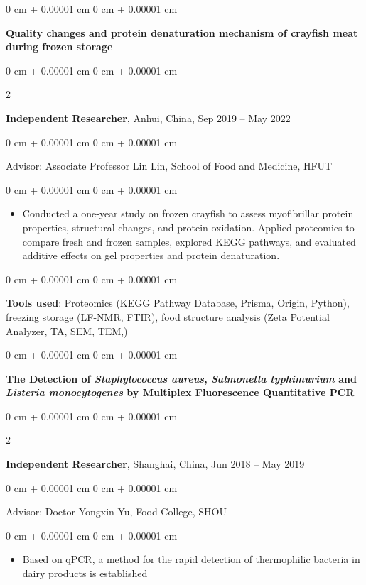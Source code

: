 \documentclass[10pt, letterpaper]{article}
\newenvironment{highlights}{
    \begin{itemize}[
        topsep=0.10 cm,
        parsep=0.10 cm,
        partopsep=0pt,
        itemsep=0pt,
        leftmargin=0 cm + 10pt
    ]
}{
    \end{itemize}
} %
\newenvironment{onecolentry}{
    \begin{adjustwidth}{
        0 cm + 0.00001 cm
    }{
        0 cm + 0.00001 cm
    }
}{
    \end{adjustwidth}
} %
\newenvironment{twocolentry}[2][]{
    \onecolentry
    \def\secondColumn{#2}
    \setcolumnwidth{\fill, 4.5 cm}
    \begin{paracol}{2}
}{
    \switchcolumn \raggedleft \secondColumn
    \end{paracol}
    \endonecolentry
} %
\newenvironment{header}{
    \setlength{\topsep}{0pt}\par\kern\topsep\centering\linespread{1}
}{
    \par\kern\topsep
} %
\begin{document}
\begin{header}
\vspace{0.2 cm}


                \begin{onecolentry}
        \textbf{\textbf{Quality changes and protein denaturation mechanism of crayfish meat during frozen storage }}
    \end{onecolentry}
        \begin{twocolentry}{
            Sep 2019 – May 2022
        }
            \textbf{Independent Researcher}, Anhui, China, \end{twocolentry}
\begin{onecolentry}
    Advisor: Associate Professor Lin Lin, School of Food and Medicine, HFUT
\end{onecolentry}
        \vspace{0.10 cm}
        \begin{onecolentry}
            \begin{highlights}
                \item Conducted a one-year study on frozen crayfish to assess myofibrillar protein properties, structural changes, and protein oxidation. Applied proteomics to compare fresh and frozen samples, explored KEGG pathways, and evaluated additive effects on gel properties and protein denaturation.
              
            \end{highlights}
        \end{onecolentry}

        \begin{onecolentry}
            \textbf{Tools used}: Proteomics (KEGG Pathway Database, Prisma, Origin, Python), freezing storage (LF-NMR, FTIR), food structure analysis (Zeta Potential Analyzer, TA, SEM, TEM,)
        \end{onecolentry}

\vspace{0.2 cm}

                    \begin{onecolentry}
        \textbf{\textbf{The Detection of \textit{Staphylococcus aureus}, \textit{Salmonella typhimurium }and \textit{Listeria monocytogenes }by Multiplex Fluorescence Quantitative PCR }
}
    \end{onecolentry}
        \begin{twocolentry}{
            Jun 2018 – May 2019
        }
            \textbf{Independent Researcher}, Shanghai, China, \end{twocolentry}
\begin{onecolentry}
    Advisor: Doctor Yongxin Yu, Food College, SHOU
\end{onecolentry}
        \vspace{0.10 cm}
        \begin{onecolentry}
            \begin{highlights}
                \item Based on qPCR, a method for the rapid detection of thermophilic bacteria in dairy products is established
             

\end{highlights}
\end{onecolentry}
\end{header}
\end{document}
